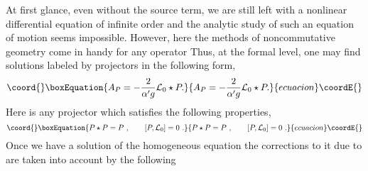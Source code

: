 \documentclass[a4paper,aps,preprint,nofootinbib,eqsecnum]{revtex4}
\begin{document}
At first glance, even without the source term, we are still left with a
nonlinear differential equation of infinite order and the analytic study of
such an equation of motion seems impossible. However, here the methods of
noncommutative geometry come in handy for any operator \coordHE{}
Thus, at the formal level, one may find solutions \coordHE{} labeled by
projectors \coordHE{} in the following form,
\begin{equation}\coord{}\boxEquation{\label{e-Ap}
A_{P}=-\frac{2}{{\alpha ^{\prime }}g}{\mathcal{L}_{0}}\star P.
}{A_{P}=-\frac{2}{{\alpha ^{\prime }}g}{\mathcal{L}_{0}}\star P.
}{ecuacion}\coordE{}\end{equation}%
Here \coordHE{} is any projector which satisfies the following properties,
\begin{equation}\coord{}\boxEquation{
P\star P=P\,\,,\qquad \left[ P,{\mathcal{L}_{0}}\right] =0\,\,.
}{
P\star P=P\,\,,\qquad \left[ P,{\mathcal{L}_{0}}\right] =0\,\,.
}{ecuacion}\coordE{}\end{equation}%
Once we have a solution \coordHE{} of the homogeneous equation\myHighlight{$,$}\coordHE{} the
corrections to it due to \myHighlight{$\gamma $}\coordHE{} are taken into account by the following
\end{document}
